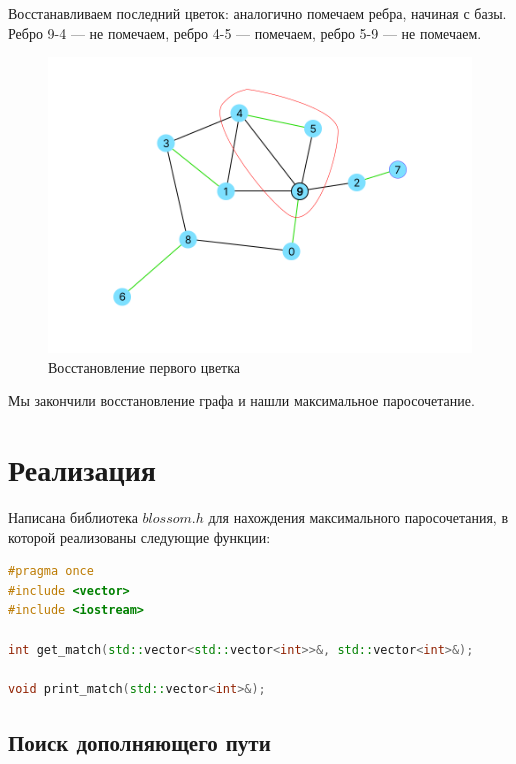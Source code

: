 \documentclass[14pt, a4paper]{extarticle}
\begin{document}
    \pagebreak

    Восстанавливаем последний цветок: аналогично помечаем ребра, начиная с базы. Ребро 9-4 --- не помечаем, ребро 4-5 --- помечаем, ребро 5-9 --- не помечаем. 

    \begin{figure}[ht!]
        \centering
        \includegraphics[scale=0.3]{7.png}
        \caption{Восстановление первого цветка}
        \label{fig:my_label}
    \end{figure} 

    Мы закончили восстановление графа и нашли максимальное паросочетание.

    \pagebreak
    
    \section*{Реализация}

    Написана библиотека $blossom.h$ для нахождения максимального паросочетания, в которой реализованы следующие функции:

    \begin{lstlisting}[language=c++]
#pragma once
#include <vector>
#include <iostream>

int get_match(std::vector<std::vector<int>>&, std::vector<int>&);

void print_match(std::vector<int>&);
    \end{lstlisting}

    \subsection*{Поиск дополняющего пути}
\end{document}
